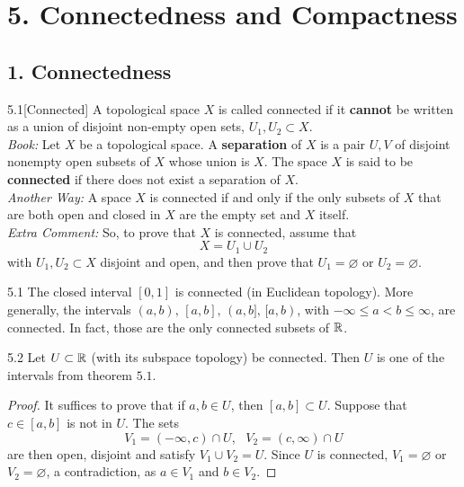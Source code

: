 \section*{5. Connectedness and Compactness}

\subsection*{1. Connectedness}

\begin{customdefinition}{5.1}[Connected]
A topological space $X$ is called connected if it {\bf cannot} be written as a union of disjoint non-empty open sets, $U_1, U_2 \subset X$.\\
\emph{Book:} Let $X$ be a topological space. A {\bf separation} of $X$ is a pair $U, V$ of disjoint nonempty open subsets of $X$ whose union is $X$. The space $X$ is said to be {\bf connected} if there does not exist a separation of $X$.\\
\emph{Another Way:} A space $X$ is connected if and only if the only subsets of $X$ that are both open and closed in $X$ are the empty set and $X$ itself.\\
\emph{Extra Comment:} So, to prove that $X$ is connected, assume that 
$$X = U_1 \cup U_2$$
with $U_1, U_2 \subset X$ disjoint and open, and then prove that $U_1 = \varnothing$ or $U_2 = \varnothing$.
\end{customdefinition}

\begin{customthm}{5.1}
The closed interval $[0, 1]$ is connected (in Euclidean topology). More generally, the intervals $(a, b),\,[a, b],\,(a, b],\,[a, b)$, with $-\infty \leqslant a < b \leqslant \infty$, are connected. In fact, those are the only connected subsets of $\mathbb{R}$. 
\end{customthm}

\begin{customthm}{5.2}
Let $U \subset \mathbb{R}$ (with its subspace topology) be connected. Then $U$ is one of the intervals from theorem $5.1$. 
\end{customthm}

\begin{proof}
It suffices to prove that if $a, b \in U$, then $[a, b] \subset U$. Suppose that $c \in [a, b]$ is not in $U$. The sets
$$V_1 = (-\infty, c) \cap U, \,\,\,\, V_2 = (c, \infty) \cap U$$
are then open, disjoint and satisfy $V_1 \cup V_2 = U$. Since $U$ is connected, $V_1 = \varnothing$ or $V_2 = \varnothing$, a contradiction, as $a \in V_1$ and $b \in V_2$.
\end{proof}

